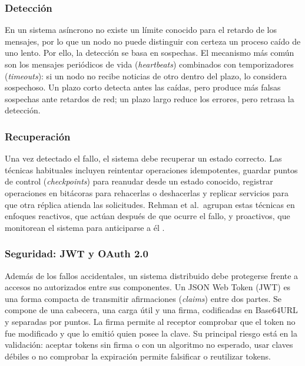 \subsubsection{Detección}

En un sistema asíncrono no existe un límite conocido para el retardo de los mensajes,
por lo que un nodo no puede distinguir con certeza un proceso caído de uno lento.
Por ello, la detección se basa en sospechas. El mecanismo más común son los mensajes
periódicos de vida (\emph{heartbeats}) combinados con temporizadores (\emph{timeouts}):
si un nodo no recibe noticias de otro dentro del plazo, lo considera sospechoso.
Un plazo corto detecta antes las caídas, pero produce más falsas sospechas ante
retardos de red; un plazo largo reduce los errores, pero retrasa la detección.

\subsubsection{Recuperación}

Una vez detectado el fallo, el sistema debe recuperar un estado correcto. Las técnicas
habituales incluyen reintentar operaciones idempotentes, guardar puntos de control
(\emph{checkpoints}) para reanudar desde un estado conocido, registrar operaciones
en bitácoras para rehacerlas o deshacerlas y replicar servicios para que otra
réplica atienda las solicitudes. Rehman et al.\ agrupan estas técnicas en enfoques
reactivos, que actúan después de que ocurre el fallo, y proactivos, que monitorean
el sistema para anticiparse a él \cite{herrera_rehman2022}.

\subsubsection{Seguridad: JWT y OAuth 2.0}

Además de los fallos accidentales, un sistema distribuido debe protegerse frente a
accesos no autorizados entre sus componentes. Un JSON Web Token (JWT) es una forma
compacta de transmitir afirmaciones (\emph{claims}) entre dos partes. Se compone de
una cabecera, una carga útil y una firma, codificadas en Base64URL y separadas por
puntos. La firma permite al receptor comprobar que el token no fue modificado y que
lo emitió quien posee la clave. Su principal riesgo está en la
validación: aceptar tokens sin firma o con un algoritmo no esperado, usar claves
débiles o no comprobar la expiración permite falsificar o reutilizar tokens.

